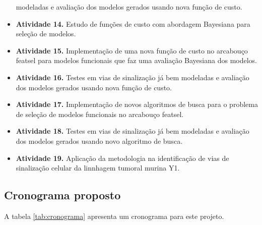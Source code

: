 \documentclass[12pt]{article}
\begin{document}
\begin{itemize}
        modeladas e avaliação dos modelos gerados usando nova função de
        custo.
    \item{\bf Atividade 14.} Estudo de funções de custo com abordagem
        Bayesiana para seleção de modelos.
    \item{\bf Atividade 15.} Implementação de uma nova função de custo 
        no arcabouço featsel para modelos funcionais que faz uma 
        avaliação Bayesiana dos modelos.
    \item{\bf Atividade 16.} Testes em vias de sinalização já bem
        modeladas e avaliação dos modelos gerados usando nova função de
        custo.
    \item{\bf Atividade 17.} Implementação de novos algoritmos de busca
        para o problema de seleção de modelos funcionais no arcabouço
        featsel.
    \item{\bf Atividade 18.} Testes em vias de sinalização já bem
        modeladas e avaliação dos modelos gerados usando novo algoritmo
        de busca.
    \item{\bf Atividade 19.} Aplicação da metodologia na identificação de vias de sinalização celular da linnhagem tumoral murina Y1.

\end{itemize}
\subsection{Cronograma proposto}
A tabela \ref{tab:cronograma} apresenta um cronograma para este projeto.
\end{document}
